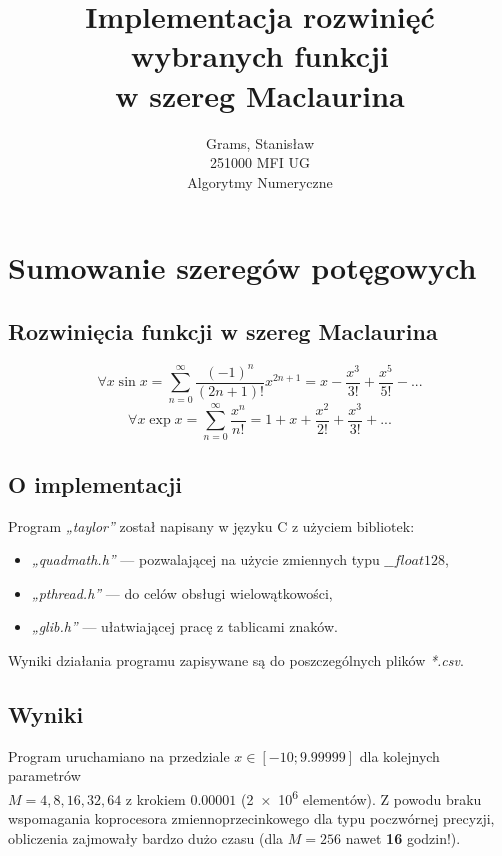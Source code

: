 \documentclass[12pt]{article}
\begin{document}
\title{Implementacja rozwinięć wybranych funkcji\\w szereg Maclaurina}
\author{Grams, Stanisław\\251000 MFI UG\\Algorytmy Numeryczne}

\maketitle

\section{Sumowanie szeregów potęgowych}

\subsection{Rozwinięcia funkcji w szereg Maclaurina}
$$ \forall{x} \sin x = \sum_{n=0}^{\infty} \frac{(-1)^n}{(2n+1)!} x^{2n+1} = x - \frac{x^3}{3!} + \frac{x^5}{5!} - ...$$
$$ \forall {x} \exp{x} = \sum_{n=0}^{\infty} \frac{x^n}{n!} = 1 + x + \frac{x^2}{2!} + \frac{x^3}{3!} + ...$$

\subsection{O implementacji}
Program \textit{„taylor”} został napisany w języku C z użyciem bibliotek:
\begin{itemize}
    \item \textit{„quadmath.h”} — pozwalającej na użycie zmiennych typu $\_\_float128$,
    \item \textit{„pthread.h”} — do celów obsługi wielowątkowości,
    \item \textit{„glib.h”} — ułatwiającej pracę z tablicami znaków.
\end{itemize}
Wyniki działania programu zapisywane są do poszczególnych plików \textit{*.csv}.

\subsection{Wyniki}
Program uruchamiano na przedziale $x \in [-10; 9.99999]$ dla kolejnych parametrów\\$M = 4, 8, 16, 32, 64$ z krokiem $0.00001$ (\num{2e6} elementów). Z powodu braku wspomagania koprocesora zmiennoprzecinkowego dla typu poczwórnej precyzji, obliczenia zajmowały bardzo dużo czasu (dla $M = 256$ nawet \textbf{16} godzin!).
\end{document}
